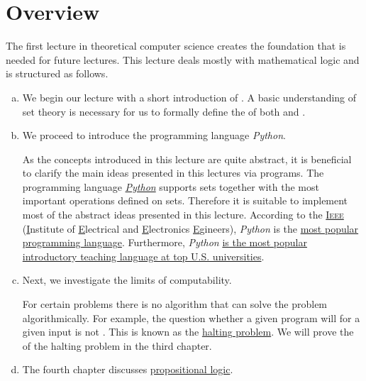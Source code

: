 \section{Overview} 
The first lecture in theoretical computer science creates the foundation that is needed for future lectures.
This lecture deals mostly with mathematical logic and is structured as follows.
\begin{enumerate}[(a)]
\item We begin our lecture with a short introduction of .  A basic understanding of set theory is
      necessary for us to formally define the  of both  and
      .
\item We proceed to introduce the programming language \textsl{Python}.

      As the concepts introduced in this lecture are quite abstract, it is beneficial to clarify the main
      ideas presented in this lectures via programs.  The programming language
      \href{http://python.org}{\textsl{Python}} supports sets together with the most important operations
      defined on sets.  Therefore it is
      suitable to implement most of the abstract ideas presented in this lecture.  According to the 
      \href{http://ieee.org}{\textsc{Ieee}} (\underline{I}nstitute of \underline{E}lectrical and
      \underline{E}lectronics \underline{E}gineers),  \textsl{Python} is the 
      \href{https://spectrum.ieee.org/top-programming-languages/}{most popular programming language}.
      Furthermore, \textsl{Python}
      \href{https://cacm.acm.org/blogs/blog-cacm/176450-python-is-now-the-most-popular-introductory-teaching-language-at-top-u-s-universities/fulltext}{is
        the most popular introductory teaching language at top U.S. universities}.
\item Next, we investigate the limits of computability.

      For certain problems there is no algorithm that can solve the problem algorithmically. 
      For example, the question whether a given program will  for a given input is not
      .  This is known as the \href{https://en.wikipedia.org/wiki/Halting_problem}{halting problem}.  
      We will prove the  of the halting problem in the third chapter. 
\item The fourth chapter discusses \href{https://en.wikipedia.org/wiki/Propositional_calculus}{propositional logic}.


\end{enumerate}

